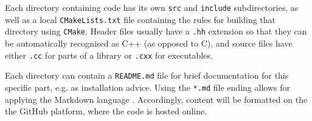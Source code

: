 Each directory containing code has its own \texttt{src} and \texttt{include} subdirectories,
as well as a local \texttt{CMakeLists.txt} file containing the rules
for building that directory using \texttt{CMake}.
Header files usually have a \texttt{.hh} extension so that they can be automatically recognised as C++
(as opposed to C), and source files have either \texttt{.cc} for parts of a library or \texttt{.cxx} for executables.

Each directory can contain a \texttt{README.md} file for brief documentation for this specific part, e.g.  
as installation advice. 
Using the \texttt{*.md} file ending allows for applying the Markdown language \cite{markdownWWW}. 
Accordingly, content will be formatted on the the GitHub platform, where the code is hosted online.
